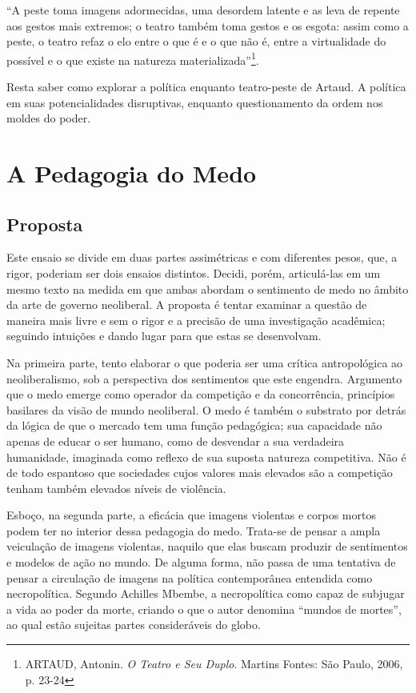 ``A peste toma imagens adormecidas, uma desordem latente e as leva de
repente aos gestos mais extremos; o teatro também toma gestos e os
esgota: assim como a peste, o teatro refaz o elo entre o que é e o que
não é, entre a virtualidade do possível e o que existe na natureza
materializada''\footnote{ARTAUD, Antonin. \emph{O Teatro e Seu Duplo}.
  Martins Fontes: São Paulo, 2006, p. 23-24}.

Resta saber como explorar a política enquanto teatro-peste de Artaud. A
política em suas potencialidades disruptivas, enquanto questionamento da
ordem nos moldes do poder.

\chapter{A Pedagogia do Medo}

\section{Proposta}

Este ensaio se divide em duas partes assimétricas e com diferentes
pesos, que, a rigor, poderiam ser dois ensaios distintos. Decidi, porém,
articulá-las em um mesmo texto na medida em que ambas abordam o
sentimento de medo no âmbito da arte de governo neoliberal. A proposta é
tentar examinar a questão de maneira mais livre e sem o rigor e a
precisão de uma investigação acadêmica; seguindo intuições e dando lugar
para que estas se desenvolvam.

Na primeira parte, tento elaborar o que poderia ser uma crítica
antropológica ao neoliberalismo, sob a perspectiva dos sentimentos que
este engendra. Argumento que o medo emerge como operador da competição e
da concorrência, princípios basilares da visão de mundo neoliberal. O
medo é também o substrato por detrás da lógica de que o mercado tem uma
função pedagógica; sua capacidade não apenas de educar o ser humano,
como de desvendar a sua verdadeira humanidade, imaginada como reflexo de
sua suposta natureza competitiva. Não é de todo espantoso que sociedades
cujos valores mais elevados são a competição tenham também elevados
níveis de violência.

Esboço, na segunda parte, a eficácia que imagens violentas e corpos
mortos podem ter no interior dessa pedagogia do medo. Trata-se de pensar
a ampla veiculação de imagens violentas, naquilo que elas buscam
produzir de sentimentos e modelos de ação no mundo. De alguma forma, não
passa de uma tentativa de pensar a circulação de imagens na política
contemporânea entendida como necropolítica. Segundo Achilles Mbembe, a
necropolítica como capaz de subjugar a vida ao poder da morte, criando o
que o autor denomina ``mundos de mortes'', ao qual estão sujeitas partes
consideráveis do globo.

